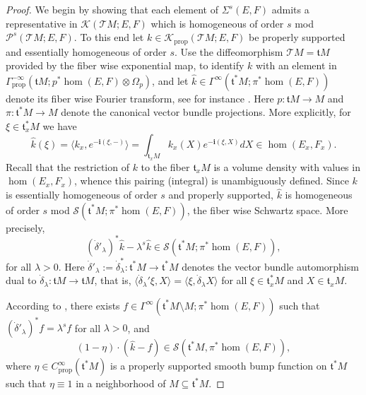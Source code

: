 \documentclass[reqno,12pt]{amsart}
\newcommand\prop{\textrm{prop}}
\theoremstyle{plain}
\theoremstyle{definition}
\begin{document}
\begin{proof}
We begin by showing that each element of $\Sigma^s(E,F)$ admits a representative in $\mathcal K(\mathcal TM;E,F)$ which is homogeneous of order $s$ mod $\mathcal P^s(\mathcal TM;E,F)$.
To this end let $k\in\mathcal K_\prop(\mathcal TM;E,F)$ be properly supported and essentially homogeneous of order $s$.
Use the diffeomorphism $\mathcal TM=\mathfrak tM$ provided by the fiber wise exponential map, to identify $k$ with an element in $\Gamma^{-\infty}_\prop(\mathfrak tM;p^*\hom(E,F)\otimes\Omega_p)$, and let $\hat k\in\Gamma^\infty(\mathfrak t^*M;\pi^*\hom(E,F))$ denote its fiber wise Fourier transform, see for instance \cite[Section~5]{EY15}.
Here $p\colon\mathfrak tM\to M$ and $\pi\colon\mathfrak t^*M\to M$ denote the canonical vector bundle projections.
More explicitly, for $\xi\in\mathfrak t_x^*M$ we have 
$$
\hat k(\xi)=\langle k_x,e^{-\mathbf i(\xi,-)}\rangle=\int_{\mathfrak t_xM}k_x(X)e^{-\mathbf i(\xi,X)}dX\in\hom(E_x,F_x).
$$
Recall that the restriction of $k$ to the fiber $\mathfrak t_xM$ is a volume density with values in $\hom(E_x,F_x)$, whence this pairing (integral) is unambiguously defined.
Since $k$ is essentially homogeneous of order $s$ and properly supported, $\hat k$ is homogeneous of order $s$ mod $\mathcal S(\mathfrak t^*M;\pi^*\hom(E,F))$, the fiber wise Schwartz space.
More precisely, 
$$
(\dot\delta'_\lambda)^*\hat k-\lambda^s\hat k\in\mathcal S(\mathfrak t^*M;\pi^*\hom(E,F)),
$$ 
for all $\lambda>0$.
Here $\dot\delta'_\lambda:=\dot\delta_\lambda^*\colon\mathfrak t^*M\to\mathfrak t^*M$ denotes the vector bundle automorphism dual to $\dot\delta_\lambda\colon\mathfrak tM\to\mathfrak tM$, that is, $\langle\dot\delta_\lambda'\xi,X\rangle=\langle\xi,\dot\delta_\lambda X\rangle$ for all $\xi\in\mathfrak t^*_xM$ and $X\in\mathfrak t_xM$.


According to \cite[Lemma~58]{EY15}, there exists $f\in\Gamma^\infty(\mathfrak t^*M\setminus M;\pi^*\hom(E,F))$ such that $(\dot\delta'_\lambda)^*f=\lambda^sf$ for all $\lambda>0$, and
\begin{equation}\label{E:QWERTY}
(1-\eta)\cdot(\hat k-f)\in\mathcal S(\mathfrak t^*M,\pi^*\hom(E,F)),
\end{equation}
where $\eta\in C^\infty_\prop(\mathfrak t^*M)$ is a properly supported smooth bump function on $\mathfrak t^*M$ such that $\eta\equiv1$ in a neighborhood of $M\subseteq\mathfrak t^*M$.



\end{proof}
\end{document}
